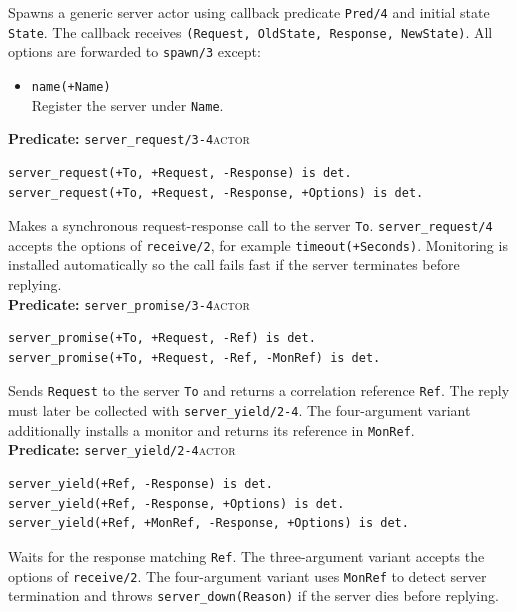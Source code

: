 \noindent Spawns a generic server actor using callback predicate
\texttt{Pred/4} and initial state \texttt{State}. The callback receives
\texttt{(Request, OldState, Response, NewState)}. All options are forwarded to
\texttt{spawn/3} except:

\begin{itemize}
\item
  \texttt{name(+Name)}\\
  Register the server under \texttt{Name}.
\end{itemize}

\bigskip
\noindent \textbf{Predicate:} \texttt{server\_request/3-4}\hfill\textsc{actor}

\begin{verbatim}
server_request(+To, +Request, -Response) is det.
server_request(+To, +Request, -Response, +Options) is det.
\end{verbatim}

\noindent Makes a synchronous request-response call to the server
\texttt{To}. \texttt{server\_request/4} accepts the options of
\texttt{receive/2}, for example \texttt{timeout(+Seconds)}. Monitoring is
installed automatically so the call fails fast if the server terminates before
replying.\\

\bigskip
\noindent \textbf{Predicate:} \texttt{server\_promise/3-4}\hfill\textsc{actor}

\begin{verbatim}
server_promise(+To, +Request, -Ref) is det.
server_promise(+To, +Request, -Ref, -MonRef) is det.
\end{verbatim}

\noindent Sends \texttt{Request} to the server \texttt{To} and returns a
correlation reference \texttt{Ref}. The reply must later be collected with
\texttt{server\_yield/2-4}. The four-argument variant additionally installs a
monitor and returns its reference in \texttt{MonRef}.\\

\bigskip
\noindent \textbf{Predicate:} \texttt{server\_yield/2-4}\hfill\textsc{actor}

\begin{verbatim}
server_yield(+Ref, -Response) is det.
server_yield(+Ref, -Response, +Options) is det.
server_yield(+Ref, +MonRef, -Response, +Options) is det.
\end{verbatim}

\noindent Waits for the response matching \texttt{Ref}. The three-argument
variant accepts the options of \texttt{receive/2}. The four-argument variant
uses \texttt{MonRef} to detect server termination and throws
\texttt{server\_down(Reason)} if the server dies before replying.\\

